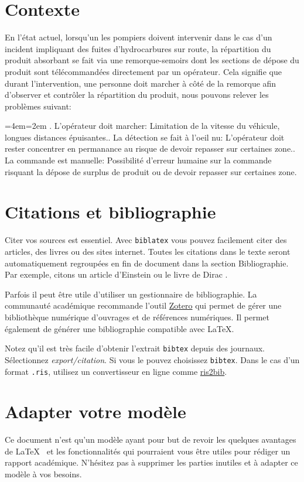 \newenvironment{listage}{%
    \par%
    \medskip
    \leftskip=4em\rightskip=2em%
    \noindent\ignorespaces}{%
    \par\medskip}

\section{Contexte}
En l'état actuel, lorsqu'un les pompiers doivent intervenir dans le cas d'un incident impliquant des fuites d'hydrocarbures sur route, la répartition
du produit absorbant se fait via une remorque-semoirs dont les sections de dépose du produit sont télécommandées directement par un opérateur.
Cela signifie que durant l'intervention, une personne doit marcher à côté de la remorque afin d'observer et contrôler la répartition du produit, nous pouvons relever les problèmes suivant:
\begin{listage}
    1. L'opérateur doit marcher: Limitation de la vitesse du véhicule, longues distances épuisantes.. La détection se fait à l'oeil nu: L'opérateur doit rester concentrer en permanance au risque de devoir repasser sur certaines zone.. La commande est manuelle: Possibilité d'erreur humaine sur la commande risquant la dépose de surplus de produit ou de devoir repasser sur certaines zone.
\end{listage}
\section{Citations et bibliographie}
Citer vos sources est essentiel. Avec \texttt{biblatex} vous pouvez facilement citer des articles, des livres ou des sites internet. Toutes les citations dans le texte seront automatiquement regroupées en fin de document dans la section \guillemotleft Bibliographie\guillemotright. Par exemple, citons un article d'Einstein \cite{einstein} ou le livre de Dirac \cite{dirac}.

Parfois il peut être utile d'utiliser un gestionnaire de bibliographie. La communauté académique recommande l'outil \href{https://www.zotero.org/}{Zotero} qui permet de gérer une bibliothèque numérique d'ouvrages et de références numériques. Il permet également de générer une bibliographie compatible avec \LaTeX.

Notez qu'il est très facile d'obtenir l'extrait \texttt{bibtex} depuis des journaux. Sélectionnez \emph{export/citation}. Si vous le pouvez choisissez \texttt{bibtex}. Dans le cas d'un format \texttt{.ris}, utilisez un convertisseur en ligne comme \href{http://www.bruot.org/ris2bib/}{ris2bib}.

\section{Adapter votre modèle}
Ce document n'est qu'un modèle ayant pour but de revoir les quelques avantages de \LaTeX~ et les fonctionnalités qui pourraient vous être utiles pour rédiger un rapport académique. N'hésitez pas à supprimer les parties inutiles et à adapter ce modèle à vos besoins.
